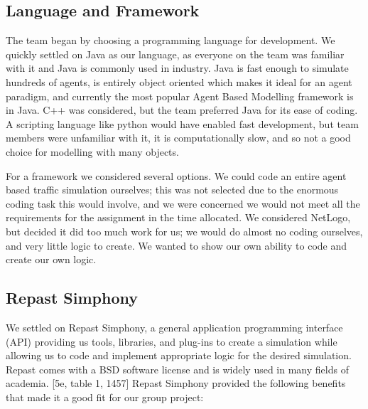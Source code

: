 \documentclass[11pt]{article}
\begin{document}
\subsection{Language and Framework}

The team began by choosing a programming language for development. We quickly settled on Java as our language, as everyone on the team was familiar with it and Java is commonly used in industry. Java is fast enough to simulate hundreds of agents, is entirely object oriented which makes it ideal for an agent paradigm, and currently the most popular Agent Based Modelling framework is in Java. C++ was considered, but the team preferred Java for its ease of coding. A scripting language like python would have enabled fast development, but team members were unfamiliar with it, it is computationally slow, and so not a good choice for modelling with many objects.

For a framework we considered several options. We could code an entire agent based traffic simulation ourselves; this was not selected due to the enormous coding task this would involve, and we were concerned we would not meet all the requirements for the assignment in the time allocated. We considered NetLogo, but decided it did too much work for us; we would do almost no coding ourselves, and very little logic to create. We wanted to show our own ability to code and create our own logic.


\subsection{Repast Simphony}

We settled on Repast Simphony, a general application programming interface (API) providing us tools, libraries, and plug-ins to create a simulation while allowing us to code and implement appropriate logic for the desired simulation. Repast comes with a BSD software license and is widely used in many fields of academia. [5e, table 1, 1457] Repast Simphony provided the following benefits that made it a good fit for our group project:
\end{document}
